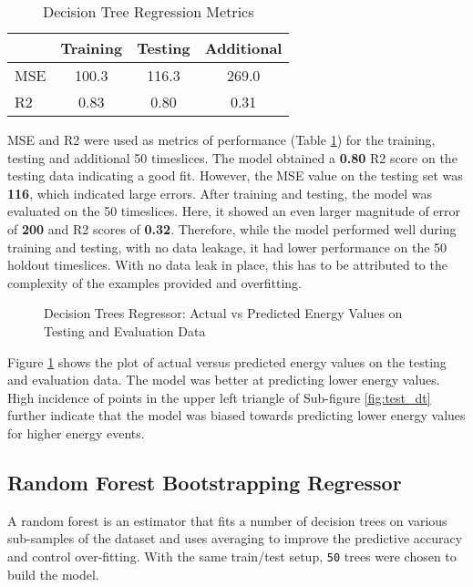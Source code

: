 \begin{table}[ht!]
    \centering
    \begin{tabular}{l c c c}
    \hline
        & Training & Testing & Additional \\
    \hline
    MSE & 100.3 &  116.3 & 269.0 \\
    R2  & 0.83 & 0.80 & 0.31 \\ 
    \hline
    \end{tabular}
    \caption{Decision Tree Regression Metrics}
    \label{tab:decision_scores}
\end{table}

MSE and R2 were used as metrics of performance (Table \ref{tab:decision_scores}) for the training, testing and additional 50 timeslices. The model obtained a \textbf{0.80} R2 score on the testing data indicating a good fit. However, the MSE value on the testing set was \textbf{116}, which indicated large errors. After training and testing, the model was evaluated on the 50 timeslices. Here, it showed an even larger magnitude of error of \textbf{200} and R2 scores of \textbf{0.32}. Therefore, while the model performed well during training and testing, with no data leakage, it had lower performance on the 50 holdout timeslices. With no data leak in place, this has to be attributed to the complexity of the examples provided and overfitting.

\begin{figure}[ht!]   
\centering
{}
\caption[]{Decision Trees Regressor: Actual vs Predicted Energy Values on Testing and Evaluation Data}
\label{fig:results_dt}
\end{figure}

Figure \ref{fig:results_dt} shows the plot of actual versus predicted energy values on the testing and evaluation data. The model was better at predicting lower energy values. High incidence of points in the upper left triangle of Sub-figure \ref{fig:test_dt} further indicate that the model was biased towards predicting lower energy values for higher energy events.

\subsection{Random Forest Bootstrapping Regressor}
A random forest is an estimator that fits a number of decision trees on various sub-samples of the dataset and uses averaging to improve the predictive accuracy and control over-fitting. With the same train/test setup, \texttt{50} trees were chosen to build the model. 

